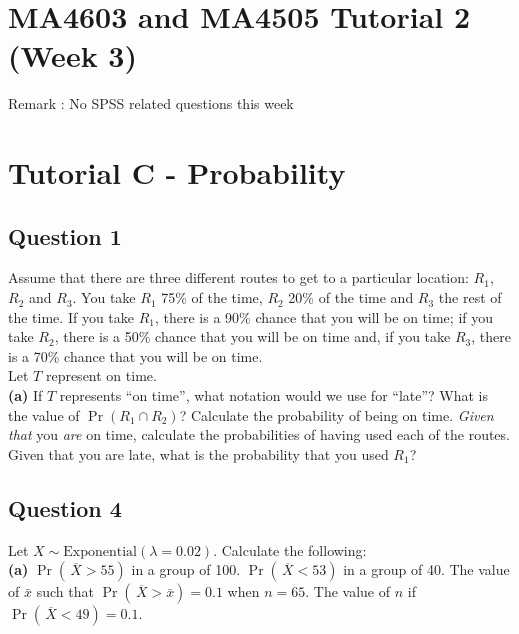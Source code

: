 \documentclass[]{article}
\begin{document}
\newpage
\section*{MA4603 and MA4505 Tutorial 2 (Week 3)}
Remark : No SPSS related questions this week 



\section{Tutorial C - Probability}	
\subsection*{Question 1}
Assume that there are three different routes to get to a particular location: $R_1$, $R_2$ and $R_3$. You take $R_1$ 75\% of the time, $R_2$ 20\% of the time and $R_3$ the rest of the time. If you take $R_1$, there is a 90\% chance that you will be on time; if you take $R_2$, there is a 50\% chance that you will be on time and, if you take $R_3$, there is a 70\% chance that you will be on time. \\[0.1cm]
Let $T$ represent on time.\\[-0.2cm]

{\bf(a)} If $T$ represents ``on time'', what notation would we use for ``late''?  What is the value of $\Pr(R_1 \cap R_2)$?  Calculate the probability of being on time.  \emph{Given that} you \emph{are} on time, calculate the probabilities of having used each of the routes.  Given that you are late, what is the probability that you used $R_1$?









\subsection*{Question 4}
Let $X \sim \text{Exponential}(\lambda=0.02)$. Calculate the following:\\[-0.2cm]

{\bf(a)} $\Pr(\,\overline{\!X} > 55)$ in a group of 100.  $\Pr(\,\overline{\!X} < 53)$ in a group of 40.  The value of $\bar x$ such that $\Pr(\,\overline{\!X} > \bar x) = 0.1$ when $n=65$.  The value of $n$ if $\Pr(\,\overline{\!X} < 49) = 0.1$.
\end{document}
